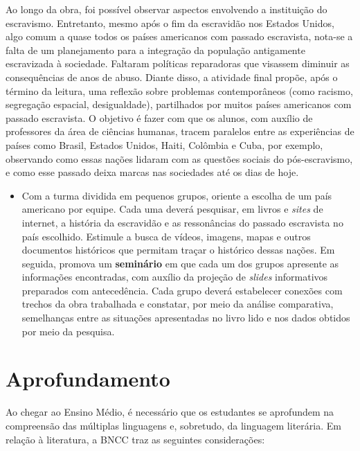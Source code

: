 \documentclass[11pt]{extarticle}
\begin{document}
Ao longo da obra, foi possível observar aspectos envolvendo
a instituição do escravismo. Entretanto, mesmo após o fim da escravidão
nos Estados Unidos, algo comum a quase todos os países americanos com
passado escravista, nota-se a falta de um planejamento para a integração
da população antigamente escravizada à sociedade. Faltaram políticas
reparadoras que visassem diminuir as consequências de anos de abuso.
Diante disso, a atividade final propõe, após o término da leitura, uma
reflexão sobre problemas contemporâneos (como racismo, segregação
espacial, desigualdade), partilhados por muitos países americanos com
passado escravista. O objetivo é fazer com que os alunos, com auxílio de
professores da área de ciências humanas, tracem paralelos entre as
experiências de países como Brasil, Estados Unidos, Haiti, Colômbia e
Cuba, por exemplo, observando como essas nações lidaram com as questões
sociais do pós-escravismo, e como esse passado deixa marcas nas
sociedades até os dias de hoje.

\begin{itemize}
\item
  Com a turma dividida em pequenos grupos, oriente a escolha de um país
  americano por equipe. Cada uma deverá pesquisar, em livros e
  \emph{sites} de internet, a história da escravidão e as ressonâncias
  do passado escravista no país escolhido. Estimule a busca de vídeos,
  imagens, mapas e outros documentos históricos que permitam traçar o
  histórico dessas nações. Em seguida, promova um \textbf{seminário} em
  que cada um dos grupos apresente as informações encontradas, com
  auxílio da projeção de \emph{slides} informativos preparados com
  antecedência. Cada grupo deverá estabelecer conexões com trechos da
  obra trabalhada e constatar, por meio da análise comparativa,
  semelhanças entre as situações apresentadas no livro lido e nos dados
  obtidos por meio da pesquisa.
\end{itemize}


\section{Aprofundamento}

Ao chegar ao Ensino Médio, é necessário que os estudantes se aprofundem
na compreensão das múltiplas linguagens e, sobretudo, da linguagem
literária. Em relação à literatura, a BNCC traz as seguintes
considerações:
\end{document}
